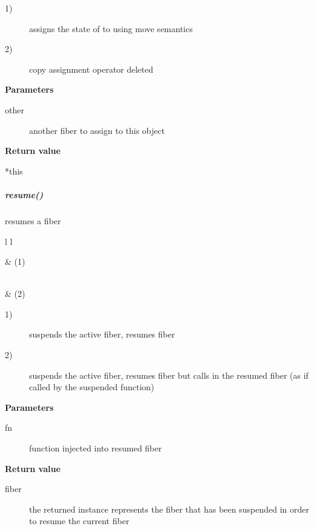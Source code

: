 \begin{description}
    \item[1)] assigns the state of  to  using move semantics
    \item[2)] copy assignment operator deleted
\end{description}

{\bfseries Parameters}
\begin{description}
    \item[other]   another fiber to assign to this object\\
\end{description}

{\bfseries Return value}
\begin{description}
    \item[*this]
\end{description}


\subparagraph*{resume()}
resumes a fiber\\

\begin{tabular}{ l l }
    \midrule

     & (1)\\

    \midrule

    \\
     & (2)\\

    \midrule
\end{tabular}

\begin{description}
    \item[1)] suspends the active fiber, resumes fiber 
    \item[2)] suspends the active fiber, resumes fiber 
              but calls  in the resumed fiber (as if called by the
              suspended function)
\end{description}

{\bfseries Parameters}
\begin{description}
    \item[fn] function injected into resumed fiber\\
\end{description}

{\bfseries Return value}
\begin{description}
    \item[fiber] the returned instance represents the fiber that has been
                 suspended in order to resume the current fiber
\end{description}


